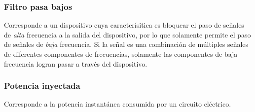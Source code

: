 \subsubsection{Filtro pasa bajos}
Corresponde a un dispositivo cuya caracterísitica es bloquear el paso de señales de \textit{alta} frecuencia a la salida del dispositivo, por lo que solamente permite el paso de señales de \textit{baja} frecuencia. Si la señal es una combinación de múltiples señales de diferentes componentes de frecuencias, solamente las componentes de baja frecuencia logran pasar a trav\'es del dispositivo. 

\subsubsection{Potencia inyectada}
Corresponde a la potencia instantánea consumida por un circuito el\'ectrico.